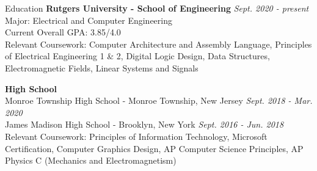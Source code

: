 \documentclass{resume}
\begin{document}

    \begin{rSection}{Education}
        {\bf Rutgers University - School of Engineering} \hfill {\em Sept. 2020 - present} \\
        Major: Electrical and Computer Engineering \\
        Current Overall GPA: 3.85/4.0 \\
        Relevant Coursework:
            Computer Architecture and Assembly Language,
            Principles of Electrical Engineering 1 \& 2,
            Digital Logic Design,
            Data Structures,
            Electromagnetic Fields,
            Linear Systems and Signals

        {\bf High School}  \\
        Monroe Township High School - Monroe Township, New Jersey \hfill {\em Sept. 2018 - Mar. 2020} \\
        James Madison High School - Brooklyn, New York \hfill {\em Sept. 2016 - Jun. 2018} \\
        Relevant Coursework:
            Principles of Information Technology,
            Microsoft Certification,
            Computer Graphics Design,
            AP Computer Science Principles,
            AP Physics C (Mechanics and Electromagnetism)
    \end{rSection}

\end{document}
